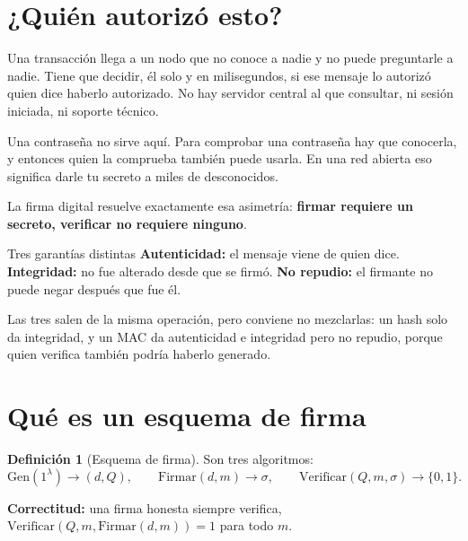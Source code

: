 \documentclass[11pt,a4paper]{article}
\theoremstyle{definition}
\newtheorem{definicion}{Definición}
\theoremstyle{plain}
\theoremstyle{remark}
\begin{document}
\section{¿Quién autorizó esto?}\label{sec:quien}

Una transacción llega a un nodo que no conoce a nadie y no puede preguntarle a
nadie. Tiene que decidir, él solo y en milisegundos, si ese mensaje lo autorizó
quien dice haberlo autorizado. No hay servidor central al que consultar, ni
sesión iniciada, ni soporte técnico.

Una contraseña no sirve aquí. Para comprobar una contraseña hay que conocerla, y
entonces quien la comprueba también puede usarla. En una red abierta eso
significa darle tu secreto a miles de desconocidos.

La firma digital resuelve exactamente esa asimetría: \textbf{firmar requiere un
secreto, verificar no requiere ninguno}.

\begin{clave}{Tres garantías distintas}
\textbf{Autenticidad:} el mensaje viene de quien dice.
\textbf{Integridad:} no fue alterado desde que se firmó.
\textbf{No repudio:} el firmante no puede negar después que fue él.

Las tres salen de la misma operación, pero conviene no mezclarlas: un hash solo
da integridad, y un MAC da autenticidad e integridad pero no repudio, porque
quien verifica también podría haberlo generado.
\end{clave}

\section{Qué es un esquema de firma}\label{sec:esquema}

\begin{definicion}[Esquema de firma]
Son tres algoritmos:
\[
  \mathrm{Gen}(1^\lambda) \to (d, Q), \qquad
  \mathrm{Firmar}(d, m) \to \sigma, \qquad
  \mathrm{Verificar}(Q, m, \sigma) \to \{0,1\}.
\]
\end{definicion}

\textbf{Correctitud:} una firma honesta siempre verifica,
$\mathrm{Verificar}(Q, m, \mathrm{Firmar}(d,m)) = 1$ para todo $m$.
\end{document}
